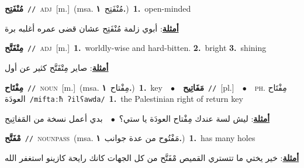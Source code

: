 \documentclass[10pt,a4paper,twoside]{article} %
\begin{document}
\begin{multicols}{2}
{{{{\setlength\topsep{0pt}\textbf{\foreignlanguage{arabic}{مُنْفَتِح}}\ {\color{gray}\texttt{//}\color{black}}\ \textsc{adj}\ [m.]\ \color{gray}(msa. \foreignlanguage{arabic}{مُنْفَتِح}~\foreignlanguage{arabic}{\textbf{١.}})\color{black}\ \textbf{1.}~open-minded\  \begin{flushright}\color{gray}\foreignlanguage{arabic}{\textbf{\underline{\foreignlanguage{arabic}{أمثلة}}}: أبوي زلمة مُنْفَتِح عشان قضى عمره أغلبه برة}\end{flushright}\color{black}} \vspace{2mm}

{\setlength\topsep{0pt}\textbf{\foreignlanguage{arabic}{مِتْفَتَّح}}\ {\color{gray}\texttt{//}\color{black}}\ \textsc{adj}\ [m.]\ \textbf{1.}~worldly-wise and hard-bitten.  \textbf{2.}~bright  \textbf{3.}~shining\  \begin{flushright}\color{gray}\foreignlanguage{arabic}{\textbf{\underline{\foreignlanguage{arabic}{أمثلة}}}: صاير مِتْفَتَّح كثير عن أول}\end{flushright}\color{black}} \vspace{2mm}

{\setlength\topsep{0pt}\textbf{\foreignlanguage{arabic}{مِفْتَاح}}\ {\color{gray}\texttt{//}\color{black}}\ \textsc{noun}\ [m.]\ \color{gray}(msa. \foreignlanguage{arabic}{مِفْتاح}~\foreignlanguage{arabic}{\textbf{١.}})\color{black}\ \textbf{1.}~key\ \ $\bullet$\ \ \setlength\topsep{0pt}\textbf{\foreignlanguage{arabic}{مَفَاتِيح}}\ {\color{gray}\texttt{//}\color{black}}\ [pl.]\ \ $\bullet$\ \ \textsc{ph.} \color{gray} \foreignlanguage{arabic}{مِفْتَاح العودَة}\color{black}\ {\color{gray}\texttt{/{\sffamily miftaːħ ʔilʕawda}/}\color{black}}\ \textbf{1.}~the Palestinian right of return key\  \begin{flushright}\color{gray}\foreignlanguage{arabic}{\textbf{\underline{\foreignlanguage{arabic}{أمثلة}}}: ليش لسة عندك مِفْتاح العودَة يا ستي؟\ $\bullet$\ \  بدي أعمل نسخة من المَفاتِيح}\end{flushright}\color{black}} \vspace{2mm}

{\setlength\topsep{0pt}\textbf{\foreignlanguage{arabic}{مْفَتَّح}}\ {\color{gray}\texttt{//}\color{black}}\ \textsc{noun\textunderscore pass}\ \color{gray}(msa. \foreignlanguage{arabic}{مَفْتُوح من عدة جوانب}~\foreignlanguage{arabic}{\textbf{١.}})\color{black}\ \textbf{1.}~has many holes\  \begin{flushright}\color{gray}\foreignlanguage{arabic}{\textbf{\underline{\foreignlanguage{arabic}{أمثلة}}}: خير يختي ما تتستري القميص مْفَتَّح من كل الجهات كانك رايحة كازينو استغفر الله}\end{flushright}\color{black}} \vspace{2mm}

}}}
\end{multicols}
\end{document}
